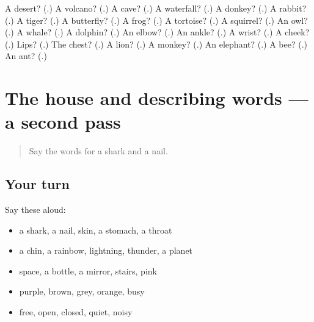 \begin{tcolorbox}[breakable,colback=teal!4,colframe=teal!35!black,title={Before you move on}]
A desert? (\textbf{}.) A volcano? (\textbf{}.) A cave? (\textbf{}.) A waterfall? (\textbf{}.) A donkey? (\textbf{}.) A rabbit? (\textbf{}.) A tiger? (\textbf{}.) A butterfly? (\textbf{}.) A frog? (\textbf{}.) A tortoise? (\textbf{}.) A squirrel? (\textbf{}.) An owl? (\textbf{}.) A whale? (\textbf{}.) A dolphin? (\textbf{}.) An elbow? (\textbf{}.) An ankle? (\textbf{}.) A wrist? (\textbf{}.) A cheek? (\textbf{}.) Lips? (\textbf{}.) The chest? (\textbf{}.) A lion? (\textbf{}.) A monkey? (\textbf{}.) An elephant? (\textbf{}.) A bee? (\textbf{}.) An ant? (\textbf{}.)
\end{tcolorbox}
\section[(dialogue)]{The house and describing words — a second pass}

\label{lesson:RU-R125-second-pass-the-house-and-describing-words}



\begin{quote}
Say the words for a shark and a nail.
\end{quote}

\subsection*{Your turn}
Say these aloud:

\begin{itemize}
\raggedright
  \item a shark, a nail, skin, a stomach, a throat
  \item a chin, a rainbow, lightning, thunder, a planet
  \item space, a bottle, a mirror, stairs, pink
  \item purple, brown, grey, orange, busy
  \item free, open, closed, quiet, noisy
\end{itemize}

